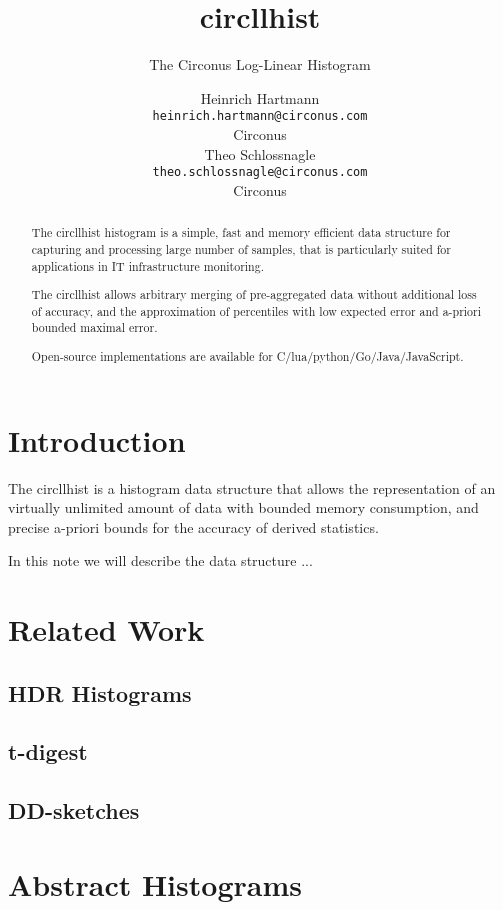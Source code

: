 \documentclass{article}
\title{circllhist}
\subtitle{The Circonus Log-Linear Histogram}
\author{
  Heinrich Hartmann \\
  \texttt{heinrich.hartmann@circonus.com} \\
  Circonus \\
  \And
  Theo Schlossnagle \\
  \texttt{theo.schlossnagle@circonus.com} \\
  Circonus
}
\theoremstyle{plain}
\begin{document}
\maketitle

\begin{abstract}
  The circllhist histogram is a simple, fast and memory efficient data structure for capturing
  and processing large number of samples, that is particularly suited for applications in
  IT infrastructure monitoring.

  The circllhist allows arbitrary merging of pre-aggregated data without additional loss of accuracy,
  and the approximation of percentiles with low expected error and a-priori bounded maximal error.

  Open-source implementations are available for C/lua/python/Go/Java/JavaScript.
\end{abstract}

\tableofcontents

\section{Introduction}
The circllhist is a histogram data structure that allows the representation of an virtually
unlimited amount of data with bounded memory consumption, and precise a-priori bounds for the
accuracy of derived statistics.

In this note we will describe the data structure ...

\section{Related Work}

\subsection{HDR Histograms}

\subsection{t-digest}

\subsection{DD-sketches}

\section{Abstract Histograms}
\end{document}
